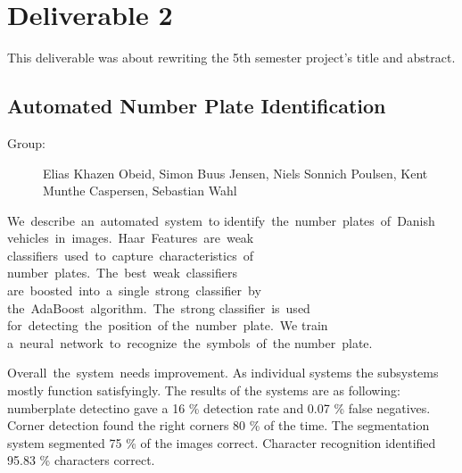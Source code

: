 \section{Deliverable 2}

This deliverable was about rewriting the 5th semester project's title and
abstract.

\subsection{Automated Number Plate Identification}
\begin{description}
  \item [Group:] Elias Khazen Obeid, Simon Buus Jensen, Niels Sonnich
		Poulsen, Kent Munthe Caspersen, Sebastian Wahl
\end{description}

We describe an automated system to identify the number plates of Danish
vehicles in images. Haar Features are weak classifiers used to capture characteristics of
number plates. The best weak classifiers are boosted into a single strong classifier by
the AdaBoost algorithm. The strong classifier is used \-for detecting the position of the number plate. We train a neural network to recognize the symbols of the number plate.

Overall the system needs improvement. As individual systems the subsystems
mostly function satisfyingly. The results of the systems are as following:
numberplate detectino gave a 16 \% detection rate and 0.07 \% false negatives.
Corner detection found the right corners 80 \% of the time. The segmentation
system segmented 75 \% of the images correct. Character recognition identified
95.83 \% characters correct.

